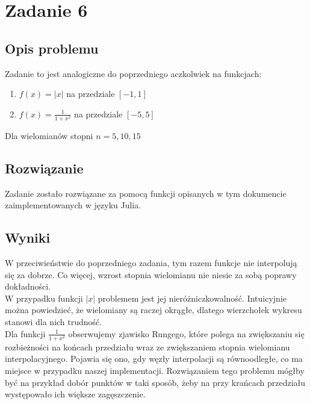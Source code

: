 \documentclass[10pt]{article}
\begin{document}
\section{Zadanie 6}
\subsection{Opis problemu}
Zadanie to jest analogiczne do poprzedniego aczkolwiek na funkcjach:
\begin{enumerate}
    \item $f(x) = |x|$ na przedziale $[-1, 1]$
    \item $f(x) = \frac{1}{1+x^2}$ na przedziale $[-5, 5]$
\end{enumerate}
Dla wielomianów stopni $n = 5,10,15$
\subsection{Rozwiązanie}
Zadanie zostało rozwiązane za pomocą funkcji opisanych w tym dokumencie zaimplementowanych w języku Julia.
\subsection{Wyniki}
W przeciwieństwie do poprzedniego zadania, tym razem funkcje nie interpolują się za dobrze. Co więcej, wzrost
stopnia wielomianu nie niesie za sobą poprawy dokładności.\\
W przypadku funkcji $|x|$ problemem jest jej nieróżniczkowalność. Intuicyjnie można powiedzieć, że wielomiany są raczej okrągłe, dlatego wierzchołek wykresu stanowi dla nich trudność.\\
Dla funkcji $\frac{1}{1+x^2}$ obserwujemy zjawisko Rungego, które polega na zwiększaniu się rozbieżności na końcach przedziału wraz ze zwiększaniem stopnia wielomianu interpolacyjnego. Pojawia się ono, gdy węzły interpolacji są równoodległe, co ma miejsce w przypadku naszej implementacji. Rozwiązaniem tego problemu mógłby być na przykład dobór punktów w taki sposób, żeby na przy krańcach przedziału występowało ich większe zagęszczenie.\\
\end{document}
